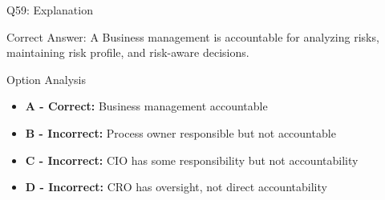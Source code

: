 \documentclass{beamer}
\begin{document}
	\begin{frame}{Q59: Explanation}
		\begin{block}{Correct Answer: A}
			Business management is accountable for analyzing risks, maintaining risk profile, and risk-aware decisions.
		\end{block}
		\begin{block}{Option Analysis}
			\begin{itemize}
				\item \textbf{A - Correct:} Business management accountable
				\item \textbf{B - Incorrect:} Process owner responsible but not accountable
				\item \textbf{C - Incorrect:} CIO has some responsibility but not accountability
				\item \textbf{D - Incorrect:} CRO has oversight, not direct accountability
			\end{itemize}
		\end{block}
	\end{frame}
	
	
\end{document}
